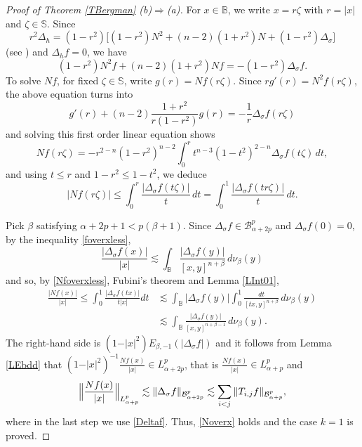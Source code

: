 \documentclass{amsart}
\theoremstyle{definition}
\theoremstyle{remark}
\begin{document}
\begin{proof}[Proof of Theorem \ref{TBergman} (b)$\Rightarrow$(a)]
For $x\in\mathbb B$, we write $x=r\zeta$ with $r=\vert x\vert$ and
$\zeta\in\mathbb S$.
Since
\begin{equation*}
r^2\Delta_h=(1-r^2)\big[(1-r^2)N^2+(n-2)(1+r^2)N+(1-r^2)\Delta_\sigma\bigr]
\end{equation*}
(see \cite[p.~28]{St1}) and $\Delta_h f=0$, we have
\begin{equation*}
(1-r^2)N^2f+(n-2)(1+r^2)Nf=-(1-r^2)\Delta_\sigma f.
\end{equation*}
To solve $Nf$, for fixed $\zeta\in\mathbb S$, write $g(r)=Nf(r\zeta)$.
Since $rg'(r)=N^2f(r\zeta)$, the above equation turns into
\begin{equation*}
g'(r)+(n-2)\frac{1+r^2}{r(1-r^2)}g(r)=-\frac{1}{r}\Delta_\sigma f(r\zeta)
\end{equation*}
and solving this first order linear equation shows
\begin{equation*}
Nf(r\zeta)=-r^{2-n}(1-r^2)^{n-2}
\int_0^r t^{n-3}(1-t^2)^{2-n}\Delta_\sigma f(t\zeta)\, dt,
\end{equation*}
and using $t\le r$ and $1-r^2\le 1-t^2$, we deduce
\begin{equation}\label{Nfoverxless}
\vert Nf(r\zeta)\vert\le\int_0^r\frac{\vert\Delta_\sigma f(t\zeta)\vert}{t}\,dt
=\int_0^1\frac{\vert\Delta_\sigma f(t r\zeta)\vert}{t}\,dt.
\end{equation}

Pick $\beta$ satisfying $\alpha+2p+1<p(\beta+1)$.
Since $\Delta_\sigma f\in\mathcal B^p_{\alpha+2p}$ and $\Delta_\sigma f(0)=0$,
by the inequality \eqref{foverxless},
\begin{equation*}
\frac{\vert\Delta_\sigma f(x)\vert}{\vert x\vert}
\lesssim \int_{\mathbb B}
\frac{\vert\Delta_\sigma f(y)\vert}{[x,y]^{n+\beta}}\,d\nu_\beta(y)
\end{equation*}
and so, by \eqref{Nfoverxless}, Fubini's theorem and Lemma \ref{LInt01},
\begin{align*}
\frac{\vert Nf(x)\vert}{\vert x\vert}
\le \int_0^1\frac{\vert\Delta_\sigma f(tx)\vert}{t\vert x\vert}dt
&\lesssim \int_{\mathbb B}\vert\Delta_\sigma f(y)\vert
\int_0^1\frac{dt}{[tx,y]^{n+\beta}}\,d\nu_\beta(y)\\
&\lesssim \int_{\mathbb B}
\frac{\vert\Delta_\sigma f(y)\vert}{[x,y]^{n+\beta-1}}\, d\nu_\beta(y).
\end{align*}
The right-hand side is $(1-\vert x\vert^2)E_{\beta,-1}(\vert\Delta_\sigma f\vert)$
and it follows from Lemma \ref{LEbdd} that
$(1-\vert x\vert^2)^{-1}\frac{Nf(x)}{\vert x\vert}\in L^p_{\alpha+2p}$,
that is
$\frac{Nf(x)}{\vert x\vert}\in L^p_{\alpha+p}$ and
\begin{equation*}
\Bigl\|\frac{N f(x)}{\vert x\vert}\Bigr\|_{L^p_{\alpha+p}}
\lesssim \|\Delta_\sigma f\|_{\mathcal B^p_{\alpha+2p}}
\lesssim \sum_{i<j}\|T_{i,j}f\|_{\mathcal B^p_{\alpha+p}},
\end{equation*}
where in the last step we use \eqref{Deltaf}.
Thus, \eqref{Noverx} holds and the case $k=1$ is proved.


\end{proof}
\end{document}
